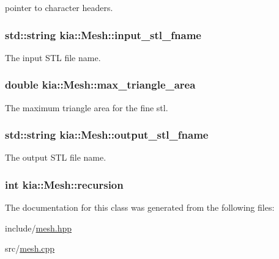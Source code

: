pointer to character headers. 

\hypertarget{classkia_1_1Mesh_aec61d34b51d3fbd92b7198465acac609}{
\subsubsection[{input\-\_\-stl\-\_\-fname}]{\setlength{\rightskip}{0pt plus 5cm}std\-::string kia\-::\-Mesh\-::input\-\_\-stl\-\_\-fname\hspace{0.3cm}{\ttfamily [private]}}}\label{classkia_1_1Mesh_aec61d34b51d3fbd92b7198465acac609}


The input S\-T\-L file name. 

\hypertarget{classkia_1_1Mesh_a10186516a1cf2cd6d65a84cbf31517d6}{
\subsubsection[{max\-\_\-triangle\-\_\-area}]{\setlength{\rightskip}{0pt plus 5cm}double kia\-::\-Mesh\-::max\-\_\-triangle\-\_\-area\hspace{0.3cm}{\ttfamily [private]}}}\label{classkia_1_1Mesh_a10186516a1cf2cd6d65a84cbf31517d6}


The maximum triangle area for the fine stl. 

\hypertarget{classkia_1_1Mesh_a09889245e99dcf6e1fc79802f4898be5}{
\subsubsection[{output\-\_\-stl\-\_\-fname}]{\setlength{\rightskip}{0pt plus 5cm}std\-::string kia\-::\-Mesh\-::output\-\_\-stl\-\_\-fname\hspace{0.3cm}{\ttfamily [private]}}}\label{classkia_1_1Mesh_a09889245e99dcf6e1fc79802f4898be5}


The output S\-T\-L file name. 

\hypertarget{classkia_1_1Mesh_a9667b9f17601ac430d74a9889538c43c}{
\subsubsection[{recursion}]{\setlength{\rightskip}{0pt plus 5cm}int kia\-::\-Mesh\-::recursion\hspace{0.3cm}{\ttfamily [private]}}}\label{classkia_1_1Mesh_a9667b9f17601ac430d74a9889538c43c}


The documentation for this class was generated from the following files\-:\begin{DoxyCompactItemize}
\item 
include/\hyperlink{mesh_8hpp}{mesh.\-hpp}\item 
src/\hyperlink{mesh_8cpp}{mesh.\-cpp}\end{DoxyCompactItemize}
